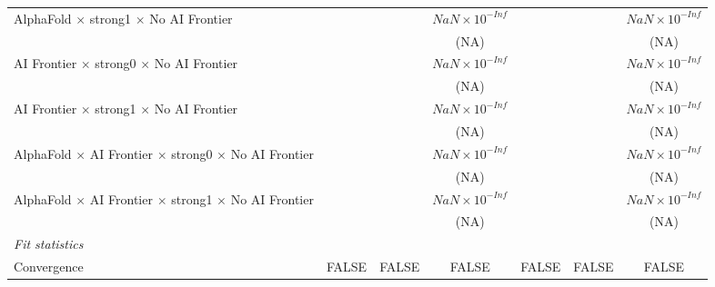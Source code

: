 \begin{tabular}{lcccccc}
   AlphaFold $\times$ strong1 $\times$ No AI Frontier                         &                        &                        & $NaN\times 10^{-Inf}$  &                        &        & $NaN\times 10^{-Inf}$\\    
                                                                              &                        &                        & (NA)                   &                        &        & (NA)\\   
   AI Frontier $\times$ strong0 $\times$ No AI Frontier                       &                        &                        & $NaN\times 10^{-Inf}$  &                        &        & $NaN\times 10^{-Inf}$\\    
                                                                              &                        &                        & (NA)                   &                        &        & (NA)\\   
   AI Frontier $\times$ strong1 $\times$ No AI Frontier                       &                        &                        & $NaN\times 10^{-Inf}$  &                        &        & $NaN\times 10^{-Inf}$\\    
                                                                              &                        &                        & (NA)                   &                        &        & (NA)\\   
   AlphaFold $\times$ AI Frontier $\times$ strong0 $\times$ No AI Frontier    &                        &                        & $NaN\times 10^{-Inf}$  &                        &        & $NaN\times 10^{-Inf}$\\    
                                                                              &                        &                        & (NA)                   &                        &        & (NA)\\   
   AlphaFold $\times$ AI Frontier $\times$ strong1 $\times$ No AI Frontier    &                        &                        & $NaN\times 10^{-Inf}$  &                        &        & $NaN\times 10^{-Inf}$\\    
                                                                              &                        &                        & (NA)                   &                        &        & (NA)\\   
   \midrule
   \emph{Fit statistics}\\
   Convergence                                                                &FALSE                   & FALSE                  & FALSE                  & FALSE                  & FALSE  & FALSE\\  

\end{tabular}
